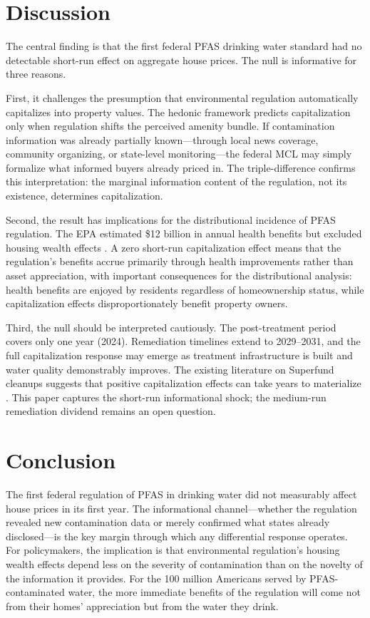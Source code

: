 \documentclass[12pt]{article}
\begin{document}
\section{Discussion}

The central finding is that the first federal PFAS drinking water standard had no detectable short-run effect on aggregate house prices. The null is informative for three reasons.

First, it challenges the presumption that environmental regulation automatically capitalizes into property values. The hedonic framework \citep{Rosen1974, Palmquist2005} predicts capitalization only when regulation shifts the perceived amenity bundle. If contamination information was already partially known---through local news coverage, community organizing, or state-level monitoring---the federal MCL may simply formalize what informed buyers already priced in. The triple-difference confirms this interpretation: the marginal information content of the regulation, not its existence, determines capitalization.

Second, the result has implications for the distributional incidence of PFAS regulation. The EPA estimated \$12 billion in annual health benefits but excluded housing wealth effects \citep{EPA2024RIA}. A zero short-run capitalization effect means that the regulation's benefits accrue primarily through health improvements rather than asset appreciation, with important consequences for the distributional analysis: health benefits are enjoyed by residents regardless of homeownership status, while capitalization effects disproportionately benefit property owners.

Third, the null should be interpreted cautiously. The post-treatment period covers only one year (2024). Remediation timelines extend to 2029--2031, and the full capitalization response may emerge as treatment infrastructure is built and water quality demonstrably improves. The existing literature on Superfund cleanups suggests that positive capitalization effects can take years to materialize \citep{Greenstone2006, Gamper2020}. This paper captures the short-run informational shock; the medium-run remediation dividend remains an open question.

\section{Conclusion}

The first federal regulation of PFAS in drinking water did not measurably affect house prices in its first year. The informational channel---whether the regulation revealed new contamination data or merely confirmed what states already disclosed---is the key margin through which any differential response operates. For policymakers, the implication is that environmental regulation's housing wealth effects depend less on the severity of contamination than on the novelty of the information it provides. For the 100 million Americans served by PFAS-contaminated water, the more immediate benefits of the regulation will come not from their homes' appreciation but from the water they drink.
\end{document}
